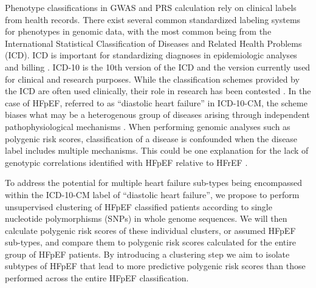 \documentclass[11pt]{article}  %
\begin{document}
\hspace{10mm}Phenotype classifications in GWAS and PRS calculation rely on clinical labels from health records. There exist several common standardized labeling systems for phenotypes in genomic data, with the most common being from the International Statistical Classification of Diseases and Related Health Problems (ICD). ICD is important for standardizing diagnoses in epidemiologic analyses and billing \cite{steindel_international_2010}. ICD-10 is the 10th version of the ICD and the version currently used for clinical and research purposes. While the classification schemes provided by the ICD are often used clinically, their role in research has been contested \cite{weiner_point_2018, cox_good_2009}. In the case of HFpEF, referred to as “diastolic heart failure” in ICD-10-CM, the scheme biases what may be a heterogenous group of diseases arising through independent pathophysiological mechanisms \cite{severino_structural_2020}. When performing genomic analyses such as polygenic risk scores, classification of a disease is confounded when the disease label includes multiple mechanisms. This could be one explanation for the lack of genotypic correlations identified with HFpEF relative to HFrEF \cite{andersson_association_2018}.

\hspace{10mm}To address the potential for multiple heart failure sub-types being encompassed within the ICD-10-CM label of “diastolic heart failure”, we propose to perform unsupervised clustering of HFpEF classified patients according to single nucleotide polymorphisms (SNPs) in whole genome sequences. We will then calculate polygenic risk scores of these individual clusters, or assumed HFpEF sub-types, and compare them to polygenic risk scores calculated for the entire group of HFpEF patients. By introducing a clustering step we aim to isolate subtypes of HFpEF that lead to more predictive polygenic risk scores than those performed across the entire HFpEF classification.
\end{document}
